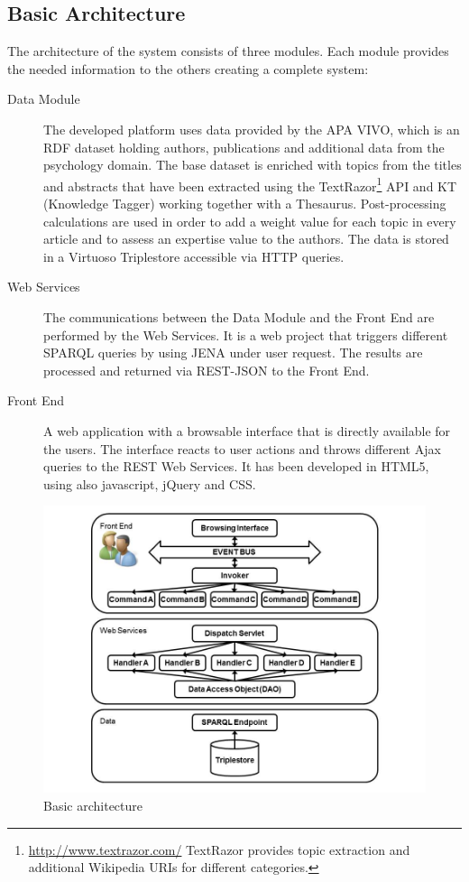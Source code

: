 \subsection{Basic Architecture}
The architecture of the system consists of three modules. Each module provides
the needed information to the others creating a complete system:
\begin{description}
\item[Data Module]The developed platform uses data provided by the APA VIVO,
which is an RDF dataset holding authors, publications and additional data from
the psychology domain. The base dataset is enriched with topics from the titles
and abstracts that have been extracted using the
TextRazor\footnote{\url{http://www.textrazor.com/} TextRazor provides topic
extraction and additional Wikipedia URIs for different categories.} API and KT
(Knowledge Tagger) working together with a Thesaurus. Post-processing
calculations are used in order to add a weight value for each topic in every
article and to assess an expertise value to the authors. The data is stored in a
Virtuoso Triplestore accessible via HTTP queries.
\item[Web Services]The communications between the Data Module and the Front End are performed by the Web Services. It is a web project that triggers different SPARQL queries by using JENA under user request. The results are processed and returned via REST-JSON to the Front End.
\item[Front End]A web application with a browsable interface that is directly available for the users. The interface reacts to user actions and throws different Ajax queries to the REST Web Services. It has been developed in HTML5, using also javascript, jQuery and CSS. 
\end{description}
\begin{figure}[!hbt]
\centering
\includegraphics[scale=0.3]{img/APAarchitecture.jpg}
\caption{Basic architecture}
\label{fig:arch}
\end{figure}
